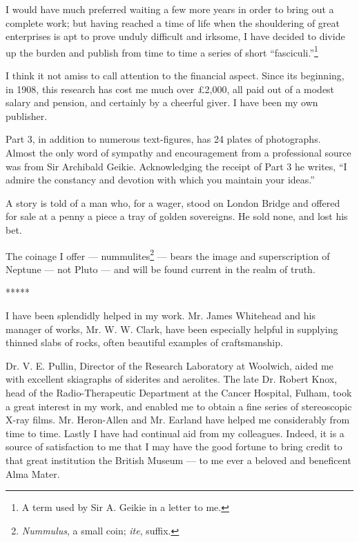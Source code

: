 \documentclass[a4paper, 12pt, oneside]{article}
\begin{document}
I would have much preferred waiting a few more years in order to bring out a complete work; but having reached a time of life when the shouldering of great enterprises is apt to prove unduly difficult and irksome, I have decided to divide up the burden and publish from time to time a series of short ``fasciculi.''\footnote{A term used by Sir A. Geikie in a letter to me.}

I think it not amiss to call attention to the financial aspect. Since its beginning, in 1908, this research has cost me much over £2,000, all paid out of a modest salary and pension, and certainly by a cheerful giver. I have been my own publisher.

Part 3, in addition to numerous text-figures, has 24 plates of photographs. Almost the only word of sympathy and encouragement from a professional source was from Sir Archibald Geikie. Acknowledging the receipt of Part 3 he writes, ``I admire the constancy and devotion with which you maintain your ideas.''

A story is told of a man who, for a wager, stood on London Bridge and offered for sale at a penny a piece a tray of golden sovereigns. He sold none, and lost his bet.

The coinage I offer --- nummulites\footnote{\emph{Nummulus}, a small coin; \emph{ite}, suffix.} --- bears the image and superscription of Neptune --- not Pluto --- and will be found current in the realm of truth.

\centerline{*\hspace{15mm}*\hspace{15mm}*\hspace{15mm}*\hspace{15mm}*}
\bigskip

I have been splendidly helped in my work. Mr. James Whitehead and his manager of works, Mr. W. W. Clark, have been especially helpful in supplying thinned slabs of rocks, often beautiful examples of craftsmanship.

Dr. V. E. Pullin, Director of the Research Laboratory at Woolwich, aided me with excellent skiagraphs of siderites and aerolites. The late Dr. Robert Knox, head of the Radio-Therapeutic Department at the Cancer Hospital, Fulham, took a great interest in my work, and enabled me to obtain a fine series of stereoscopic X-ray films. Mr. Heron-Allen and Mr. Earland have helped me considerably from time to time. Lastly I have had continual aid from my colleagues. Indeed, it is a source of satisfaction to me that I may have the good fortune to bring credit to that great institution the British Museum --- to me ever a beloved and beneficent Alma Mater.
\clearpage
\end{document}
